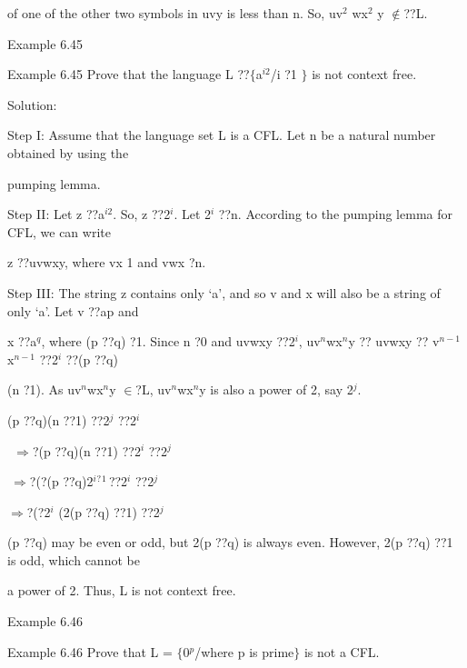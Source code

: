 \noindent of one of the other two symbols in uvy is less than n. So, uv${}^{2}$ wx${}^{2}$ y $\mathrm{\notin }$??L.

\noindent Example 6.45

\noindent  Example 6.45     Prove that the language L ??$\mathrm{\{}$a${}^{i2}$/i ?1 $\mathrm{\}}$ is not context free.

\noindent Solution:

\noindent Step I: Assume that the language set L is a CFL. Let n be a natural number obtained by using the

\noindent pumping lemma.

\noindent Step II: Let z ??a${}^{i2}$. So, {\textbar} z {\textbar} ??2${}^{i}$. Let 2${}^{i}$ ??n. According to the pumping lemma for CFL, we can write

\noindent z ??uvwxy, where {\textbar} vx {\textbar} 1 and {\textbar} vwx {\textbar} ?n.

\noindent Step III: The string z contains only `a', and so v and x will also be a string of only `a'. Let v ??ap and

\noindent x ??a${}^{q}$, where (p ??q) ?1. Since n ?0 and uvwxy ??2${}^{i}$, {\textbar} uv${}^{n}$wx${}^{n}$y {\textbar} ??{\textbar} uvwxy {\textbar} ??{\textbar} v${}^{n-1}$x${}^{n-1}$ {\textbar} ??2${}^{i}$ ??(p ??q)

\noindent (n ?1). As uv${}^{n}$wx${}^{n}$y $\mathrm{\in }$?L, {\textbar} uv${}^{n}$wx${}^{n}$y {\textbar} is also a power of 2, say 2${}^{j}$.

\noindent       (p ??q)(n ??1) ??2${}^{j}$ ??2${}^{i}$

\noindent $\mathrm{\ \ }\mathrm{\Rightarrow }$?(p ??q)(n ??1) ??2${}^{i}$ ??2${}^{j}$

\noindent $\mathrm{\ }\mathrm{\Rightarrow }$?(?(p ??q)2${}^{i}$${}^{\mathrm{\textrm{?}}}$${}^{1\ }$??2${}^{i}$ ??2${}^{j}$

\noindent  $\mathrm{\Rightarrow }$?(?2${}^{i}$ (2(p ??q) ??1) ??2${}^{j}$

\noindent (p ??q) may be even or odd, but 2(p ??q) is always even. However, 2(p ??q) ??1 is odd, which cannot be

\noindent a power of 2. Thus, L is not context free.

\noindent Example 6.46

\noindent Example 6.46 Prove that L = $\mathrm{\{}$0${}^{p}$/where p is prime$\mathrm{\}}$ is not a CFL.

